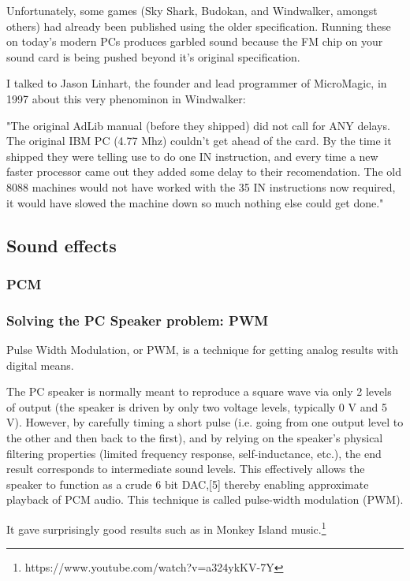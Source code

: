 Unfortunately, some games (Sky Shark, Budokan, and Windwalker, amongst others) had already been published using the older specification. Running these on today's modern PCs produces garbled sound because the FM chip on your sound card is being pushed beyond it's original specification.

I talked to Jason Linhart, the founder and lead programmer of MicroMagic, in 1997 about this very phenominon in Windwalker:

"The original AdLib manual (before they shipped) did not call for ANY delays. The original IBM PC (4.77 Mhz) couldn't get ahead of the card. By the time it shipped they were telling use to do one IN instruction, and every time a new faster processor came out they added some delay to their recomendation. The old 8088 machines would not have worked with the 35 IN instructions now required, it would have slowed the machine down so much nothing else could get done."


\subsection{Sound effects}
\par
\begin{figure}[H]
\centering
 \end{figure}
\par

\subsubsection{PCM}


\subsubsection{Solving the PC Speaker problem: PWM}
Pulse Width Modulation, or PWM, is a technique for getting analog results with digital means.




\par
 \begin{fancyquotes}
  The PC speaker is normally meant to reproduce a square wave via only 2 levels of output (the speaker is driven by only two voltage levels, typically 0 V and 5 V). However, by carefully timing a short pulse (i.e. going from one output level to the other and then back to the first), and by relying on the speaker's physical filtering properties (limited frequency response, self-inductance, etc.), the end result corresponds to intermediate sound levels. This effectively allows the speaker to function as a crude 6 bit DAC,[5] thereby enabling approximate playback of PCM audio. This technique is called pulse-width modulation (PWM).
 \end{fancyquotes}
\par
  It gave surprisingly good results such as in Monkey Island music.\footnote{https://www.youtube.com/watch?v=a324ykKV-7Y}

